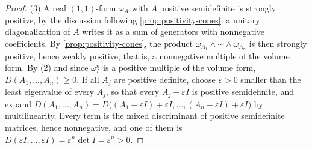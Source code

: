 \begin{proof}
(3) A real $(1,1)$-form $\omega_A$ with $A$ positive semidefinite is strongly positive, by the discussion following \cref{prop:positivity-cones}: a unitary diagonalization of $A$ writes it as a sum of generators with nonnegative coefficients. By \cref{prop:positivity-cones}, the product $\omega_{A_1}\wedge\cdots\wedge\omega_{A_n}$ is then strongly positive, hence weakly positive, that is, a nonnegative multiple of the volume form. By (2) and since $\omega_I^n$ is a positive multiple of the volume form, $D(A_1,\ldots,A_n)\geq0$. If all $A_j$ are positive definite, choose $\varepsilon>0$ smaller than the least eigenvalue of every $A_j$, so that every $A_j-\varepsilon I$ is positive semidefinite, and expand $D(A_1,\ldots,A_n)=D\bigl((A_1-\varepsilon I)+\varepsilon I,\ldots,(A_n-\varepsilon I)+\varepsilon I\bigr)$ by multilinearity. Every term is the mixed discriminant of positive semidefinite matrices, hence nonnegative, and one of them is $D(\varepsilon I,\ldots,\varepsilon I)=\varepsilon^n\det I=\varepsilon^n>0$.
\end{proof}


